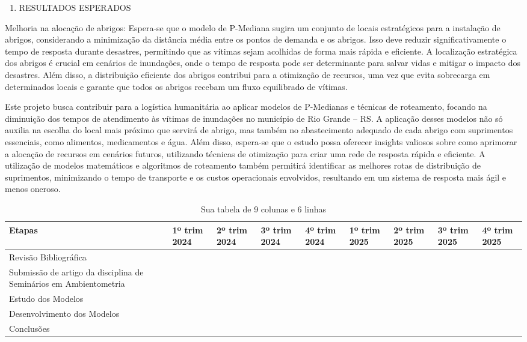 \documentclass[
]{article}
\providecommand{\tightlist}{%
  \setlength{\itemsep}{0pt}\setlength{\parskip}{0pt}}
\begin{document}
\begin{enumerate}
\def\labelenumi{\arabic{enumi}.}
\setcounter{enumi}{4}
\tightlist
\item
  RESULTADOS ESPERADOS
\end{enumerate}

Melhoria na alocação de abrigos: Espera-se que o modelo de P-Mediana
sugira um conjunto de locais estratégicos para a instalação de abrigos,
considerando a minimização da distância média entre os pontos de demanda
e os abrigos. Isso deve reduzir significativamente o tempo de resposta
durante desastres, permitindo que as vítimas sejam acolhidas de forma
mais rápida e eficiente. A localização estratégica dos abrigos é crucial
em cenários de inundações, onde o tempo de resposta pode ser
determinante para salvar vidas e mitigar o impacto dos desastres. Além
disso, a distribuição eficiente dos abrigos contribui para a otimização
de recursos, uma vez que evita sobrecarga em determinados locais e
garante que todos os abrigos recebam um fluxo equilibrado de vítimas.

Este projeto busca contribuir para a logística humanitária ao aplicar
modelos de P-Medianas e técnicas de roteamento, focando na diminuição
dos tempos de atendimento às vítimas de inundações no município de Rio
Grande -- RS. A aplicação desses modelos não só auxilia na escolha do
local mais próximo que servirá de abrigo, mas também no abastecimento
adequado de cada abrigo com suprimentos essenciais, como alimentos,
medicamentos e água. Além disso, espera-se que o estudo possa oferecer
insights valiosos sobre como aprimorar a alocação de recursos em
cenários futuros, utilizando técnicas de otimização para criar uma rede
de resposta rápida e eficiente. A utilização de modelos matemáticos e
algoritmos de roteamento também permitirá identificar as melhores rotas
de distribuição de suprimentos, minimizando o tempo de transporte e os
custos operacionais envolvidos, resultando em um sistema de resposta
mais ágil e menos oneroso.

\begin{table}[ht]
\centering
\begin{tabular}{|p{3cm}|p{1.5cm}|p{1.5cm}|p{1.5cm}|p{1.5cm}|p{1.5cm}|p{1.5cm}|p{1.5cm}|p{1.5cm}|}
\hline
Etapas & 1º trim 2024 & 2º trim 2024 & 3º trim 2024 & 4º trim 2024 & 1º trim 2025 & 2º trim 2025 & 3º trim 2025 & 4º trim 2025 \\ \hline
Revisão Bibliográfica   &    &    &    &    &    &    &    &    \\ \hline
Submissão de artigo da
disciplina de Seminários
em Ambientometria   &    &    &    &    &    &    &    &    \\ \hline
Estudo dos Modelos   &    &    &    &    &    &    &    &    \\ \hline
Desenvolvimento dos Modelos &    &    &    &    &    &    &    &    \\ \hline
Conclusões   &    &    &    &    &    &    &    &    \\ \hline
\end{tabular}
\caption{Sua tabela de 9 colunas e 6 linhas}
\end{table}
\end{document}
